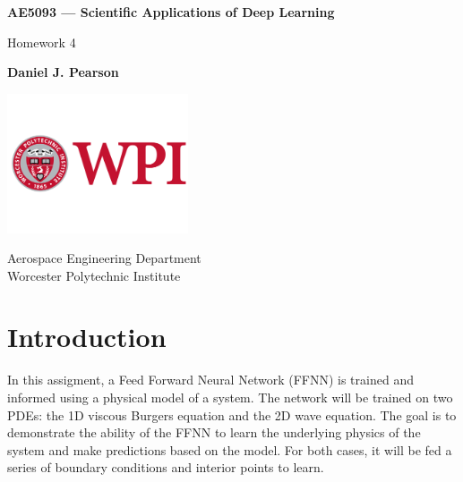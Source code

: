 \documentclass[11pt]{article}
\begin{document}
 


\begin{titlepage}
    \begin{center}
        \vspace*{1cm}

        \textbf{AE5093 — Scientific Applications of Deep Learning}

        \vspace{0.5cm}
            Homework 4
                
        \vspace{1.5cm}

        \textbf{Daniel J. Pearson}

        \vfill
                
        \vspace{0.8cm}
        
        \includegraphics[width=0.4\textwidth]{WPI_LOGO}

                
        Aerospace Engineering Department\\
        Worcester Polytechnic Institute\\
        \date{\today}
                
    \end{center}
\end{titlepage}

\pagebreak

\section{Introduction}
In this assigment, a Feed Forward Neural Network (FFNN) is trained and informed using a physical model of a system. The network will be trained on two PDEs: the 1D viscous Burgers equation and the 2D wave equation. The goal is to demonstrate the ability of the FFNN to learn the underlying physics of the system and make predictions based on the model. For both cases, it will be fed a series of boundary conditions and interior points to learn. 
\end{document}
